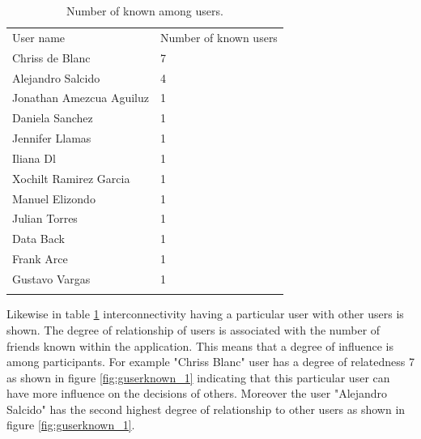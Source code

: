 \begin{table}
\small
\caption{Number of known among users.}
\label{tab:knownUsers_1}
\centering
\small
\begin{tabular}{p{3cm} p{3cm}  }
\hline\noalign{\smallskip}
 User name & Number of known users \\
\noalign{\smallskip}\hline\noalign{\smallskip}
\small{Chriss de Blanc } & \small{7}  \\ \hline
\small{Alejandro Salcido } & \small{4}  \\ \hline
\small{Jonathan Amezcua Aguiluz } & \small{1}  \\ \hline
\small{Daniela Sanchez } & \small{1}  \\ \hline
\small{Jennifer Llamas} & \small{1}  \\ \hline
\small{Iliana Dl } & \small{1}  \\ \hline
\small{Xochilt Ramirez Garcia } & \small{1}  \\ \hline
\small{Manuel Elizondo } & \small{1}  \\ \hline
\small{Julian Torres } & \small{1}  \\ \hline
\small{Data Back } & \small{1}  \\ \hline
\small{Frank Arce } & \small{1}  \\ \hline
\small{Gustavo Vargas } & \small{1}  \\ \hline
\noalign{\smallskip}\hline
\end{tabular}
\end{table}

Likewise in table \ref{tab:knownUsers_1} interconnectivity having a particular
user with other users is shown. The degree of relationship of users is
associated with the number of friends known within the application. This means
that a degree of influence is among participants. For example  "Chriss
Blanc" user has a degree of relatedness 7 as shown in figure
\ref{fig:guserknown_1} indicating that this particular user can have more
influence on the decisions of others. Moreover the user "Alejandro Salcido" has
the second highest degree of relationship to other users as shown in figure
\ref{fig:guserknown_1}.

